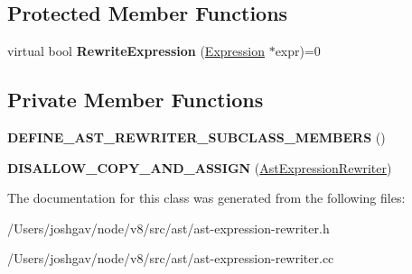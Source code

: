 \subsection*{Protected Member Functions}
\begin{DoxyCompactItemize}
\item 
virtual bool {\bfseries Rewrite\+Expression} (\hyperlink{classv8_1_1internal_1_1_expression}{Expression} $\ast$expr)=0\hypertarget{classv8_1_1internal_1_1_ast_expression_rewriter_a740a6539641ff3f27246e7ce1601474e}{}\label{classv8_1_1internal_1_1_ast_expression_rewriter_a740a6539641ff3f27246e7ce1601474e}

\end{DoxyCompactItemize}
\subsection*{Private Member Functions}
\begin{DoxyCompactItemize}
\item 
{\bfseries D\+E\+F\+I\+N\+E\+\_\+\+A\+S\+T\+\_\+\+R\+E\+W\+R\+I\+T\+E\+R\+\_\+\+S\+U\+B\+C\+L\+A\+S\+S\+\_\+\+M\+E\+M\+B\+E\+RS} ()\hypertarget{classv8_1_1internal_1_1_ast_expression_rewriter_af5d8e61c5bee294e91312d72587c348b}{}\label{classv8_1_1internal_1_1_ast_expression_rewriter_af5d8e61c5bee294e91312d72587c348b}

\item 
{\bfseries D\+I\+S\+A\+L\+L\+O\+W\+\_\+\+C\+O\+P\+Y\+\_\+\+A\+N\+D\+\_\+\+A\+S\+S\+I\+GN} (\hyperlink{classv8_1_1internal_1_1_ast_expression_rewriter}{Ast\+Expression\+Rewriter})\hypertarget{classv8_1_1internal_1_1_ast_expression_rewriter_a1bf9bae00e4d5e669575d1fa7395560e}{}\label{classv8_1_1internal_1_1_ast_expression_rewriter_a1bf9bae00e4d5e669575d1fa7395560e}

\end{DoxyCompactItemize}


The documentation for this class was generated from the following files\+:\begin{DoxyCompactItemize}
\item 
/\+Users/joshgav/node/v8/src/ast/ast-\/expression-\/rewriter.\+h\item 
/\+Users/joshgav/node/v8/src/ast/ast-\/expression-\/rewriter.\+cc\end{DoxyCompactItemize}
